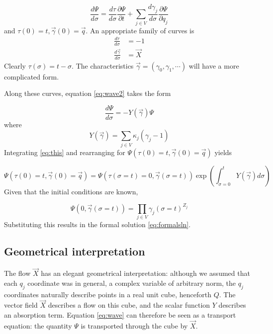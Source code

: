 \documentclass{article}
\begin{document}
\begin{equation}
    \frac{d \Psi}{d \sigma} = \frac{d \tau}{d \sigma} \frac{\partial \Psi}{\partial t} 
    + \sum_{j \in V} \frac{d \gamma_j}{d \sigma} \frac{\partial \Psi}{\partial q_j}
\end{equation}
and $\tau(0) = t,\vec{\gamma}(0) = \vec{q}$. An appropriate family of curves is
\begin{align}
    \frac{d \tau}{d \sigma} &= -1
    \nonumber \\
    \frac{d \vec{\gamma}}{d \sigma} &= \vec{X}
    \nonumber
\end{align}
Clearly $\tau(\sigma) = t - \sigma$. The characteristics
$\vec{\gamma}=(\gamma_0,\gamma_1,\cdots)$ will have a more complicated form.

Along these curves, equation
\eqref{eq:wave2} takes the form

\begin{equation}
    \frac{d \Psi}{d \sigma} = -Y(\vec{\gamma}) \Psi
    \label{eq:this}
\end{equation}
where
\begin{equation}
    Y(\vec{\gamma}) = \sum_{j \in V}\kappa_j (\gamma_j - 1)
\end{equation}
Integrating \eqref{eq:this} and rearranging for $\Psi(\tau(0) = t, \vec{\gamma}(0) =
\vec{q})$ yields

\begin{equation}
    \Psi(\tau(0) = t, \vec{\gamma}(0) = \vec{q})
    = \Psi(\tau(\sigma = t) = 0, \vec{\gamma}(\sigma = t))
    \exp\left(\int_{\sigma=0}^t Y(\vec{\gamma}) d\sigma\right)
\end{equation}
Given that the initial conditions are known,

\begin{equation}
    \Psi(0, \vec{\gamma}(\sigma=t)) = \prod_{j \in V} \gamma_j(\sigma=t)^{Z_j}
\end{equation}
Substituting this results in the formal solution \eqref{eq:formalsln}.


\subsection{Geometrical interpretation}

The flow $\vec{X}$ has an elegant geometrical interpretation: although we
assumed that each $q_j$ coordinate was in general, a complex variable of
arbitrary norm, the $q_j$ coordinates naturally describe points in a real unit
cube, henceforth $Q$. The vector field $\vec{X}$ describes a flow on this cube, and the
scalar function $Y$ describes an absorption term. Equation \eqref{eq:wave} can
therefore be seen as a transport equation: the quantity $\Psi$ is transported
through the cube by $\vec{X}$.
\end{document}

